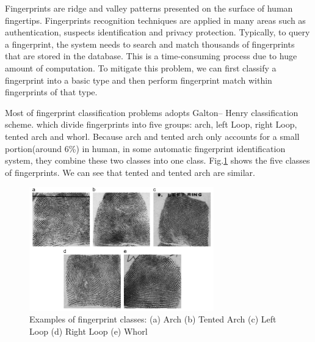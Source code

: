 

Fingerprints are ridge and valley patterns presented on the surface of human fingertips.
%
Fingerprints recognition techniques are applied in many areas such as authentication, suspects identification and privacy protection.
%
Typically, to query a fingerprint, the system needs to search and match thousands of fingerprints that are stored in the database. This is a time-consuming process due to huge amount of computation.
%
To mitigate this problem, we can first classify a fingerprint into a basic type and then perform fingerprint match within fingerprints of that type.
%

%
Most of fingerprint classification problems adopts Galton– Henry classification scheme.\cite{henry1905classification} which divide fingerprints into five groups: arch, left Loop, right Loop, tented arch and whorl. 
%
Because arch and tented arch only accounts for a small portion(around 6\%) in human, in some automatic fingerprint identification system, they combine these two classes into one class. 
%
Fig.\ref{fig.fingerprint_classes} shows the five classes of fingerprints. We can see that tented and tented arch are similar.

\begin{figure}[!ht]
	\begin{center}
		\includegraphics[width=8cm]{fig/Fingerprint_classes.png}
	\end{center}
	\caption{Examples of fingerprint classes: (a) Arch (b) Tented Arch (c) Left Loop (d) Right Loop  (e) Whorl \cite{cao2013fingerprint}} 
	\label{fig.fingerprint_classes}
\end{figure}

